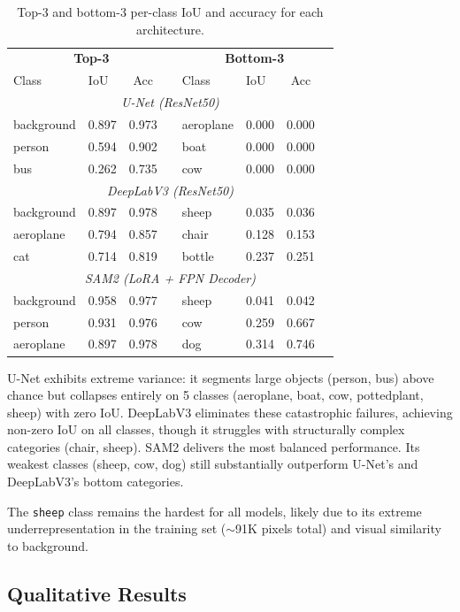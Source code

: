 \documentclass[11pt]{article}
\begin{document}
\begin{table}[H]
\centering
\caption{Top-3 and bottom-3 per-class IoU and accuracy for each architecture.}
\label{tab:perclass}
\small
\begin{tabular}{llcc|llcc}
\toprule
\multicolumn{4}{c|}{\textbf{Top-3}} & \multicolumn{4}{c}{\textbf{Bottom-3}} \\
Class & IoU & Acc & & Class & IoU & Acc & \\
\midrule
\multicolumn{8}{c}{\textit{U-Net (ResNet50)}} \\
background & 0.897 & 0.973 & & aeroplane & 0.000 & 0.000 \\
person & 0.594 & 0.902 & & boat & 0.000 & 0.000 \\
bus & 0.262 & 0.735 & & cow & 0.000 & 0.000 \\
\midrule
\multicolumn{8}{c}{\textit{DeepLabV3 (ResNet50)}} \\
background & 0.897 & 0.978 & & sheep & 0.035 & 0.036 \\
aeroplane & 0.794 & 0.857 & & chair & 0.128 & 0.153 \\
cat & 0.714 & 0.819 & & bottle & 0.237 & 0.251 \\
\midrule
\multicolumn{8}{c}{\textit{SAM2 (LoRA + FPN Decoder)}} \\
background & 0.958 & 0.977 & & sheep & 0.041 & 0.042 \\
person & 0.931 & 0.976 & & cow & 0.259 & 0.667 \\
aeroplane & 0.897 & 0.978 & & dog & 0.314 & 0.746 \\
\bottomrule
\end{tabular}
\end{table}

U-Net exhibits extreme variance: it segments large objects (person, bus) above chance but collapses entirely on 5 classes (aeroplane, boat, cow, pottedplant, sheep) with zero IoU. DeepLabV3 eliminates these catastrophic failures, achieving non-zero IoU on all classes, though it struggles with structurally complex categories (chair, sheep). SAM2 delivers the most balanced performance. Its weakest classes (sheep, cow, dog) still substantially outperform U-Net's and DeepLabV3's bottom categories.

The \texttt{sheep} class remains the hardest for all models, likely due to its extreme underrepresentation in the training set ($\sim$91K pixels total) and visual similarity to background.

\subsection{Qualitative Results}
\end{document}
